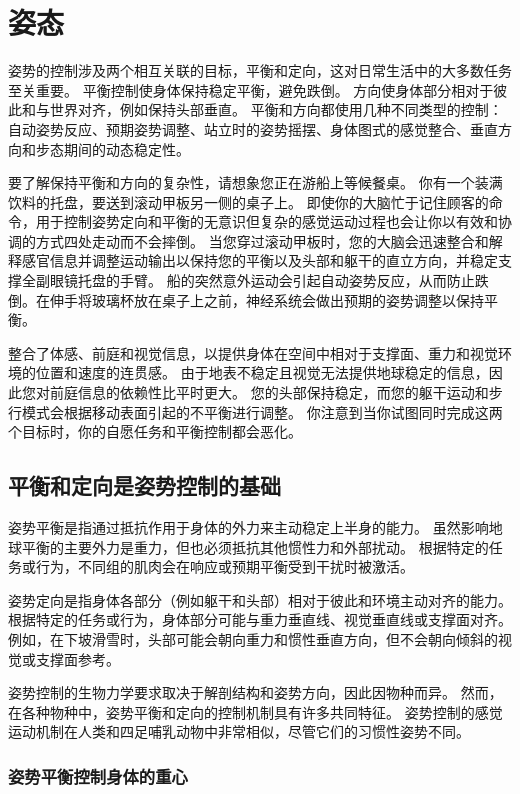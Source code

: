 \chapter{姿态} \label{chap:chap36}

姿势的控制涉及两个相互关联的目标，平衡和定向，这对日常生活中的大多数任务至关重要。
平衡控制使身体保持稳定平衡，避免跌倒。
方向使身体部分相对于彼此和与世界对齐，例如保持头部垂直。
平衡和方向都使用几种不同类型的控制：
自动姿势反应、预期姿势调整、站立时的姿势摇摆、身体图式的感觉整合、垂直方向和步态期间的动态稳定性。


要了解保持平衡和方向的复杂性，请想象您正在游船上等候餐桌。
你有一个装满饮料的托盘，要送到滚动甲板另一侧的桌子上。
即使你的大脑忙于记住顾客的命令，用于控制姿势定向和平衡的无意识但复杂的感觉运动过程也会让你以有效和协调的方式四处走动而不会摔倒。
当您穿过滚动甲板时，您的大脑会迅速整合和解释感官信息并调整运动输出以保持您的平衡以及头部和躯干的直立方向，并稳定支撑全副眼镜托盘的手臂。
船的突然意外运动会引起自动姿势反应，从而防止跌倒。在伸手将玻璃杯放在桌子上之前，神经系统会做出预期的姿势调整以保持平衡。


整合了体感、前庭和视觉信息，以提供身体在空间中相对于支撑面、重力和视觉环境的位置和速度的连贯感。
由于地表不稳定且视觉无法提供地球稳定的信息，因此您对前庭信息的依赖性比平时更大。
您的头部保持稳定，而您的躯干运动和步行模式会根据移动表面引起的不平衡进行调整。
你注意到当你试图同时完成这两个目标时，你的自愿任务和平衡控制都会恶化。



\section{平衡和定向是姿势控制的基础}

姿势平衡是指通过抵抗作用于身体的外力来主动稳定上半身的能力。
虽然影响地球平衡的主要外力是重力，但也必须抵抗其他惯性力和外部扰动。
根据特定的任务或行为，不同组的肌肉会在响应或预期平衡受到干扰时被激活。


姿势定向是指身体各部分（例如躯干和头部）相对于彼此和环境主动对齐的能力。
根据特定的任务或行为，身体部分可能与重力垂直线、视觉垂直线或支撑面对齐。
例如，在下坡滑雪时，头部可能会朝向重力和惯性垂直方向，但不会朝向倾斜的视觉或支撑面参考。


姿势控制的生物力学要求取决于解剖结构和姿势方向，因此因物种而异。
然而，在各种物种中，姿势平衡和定向的控制机制具有许多共同特征。
姿势控制的感觉运动机制在人类和四足哺乳动物中非常相似，尽管它们的习惯性姿势不同。



\subsection{姿势平衡控制身体的重心}

